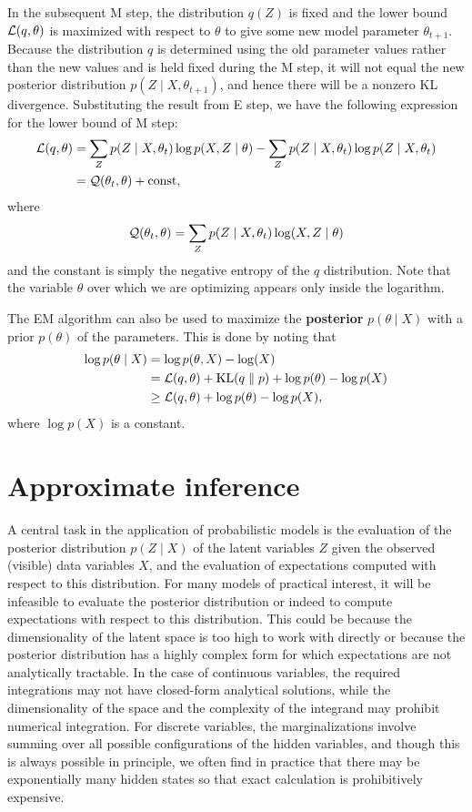 \documentclass[a4paper]{article}
\begin{document}
In the subsequent M step, the distribution $q(Z)$ is fixed
and the lower bound $\mathcal{L}(q, \theta)$ is maximized with
respect to $\theta$ to give some new model parameter
$\theta_{t + 1}$. Because the distribution $q$ is determined
using the old parameter values rather than the new values
and is held fixed during the M step, it will not equal the
new posterior distribution $p(Z \mid X, \theta_{t+1})$,
and hence there will be a nonzero KL divergence.
Substituting the result from E step, we have the following
expression for the lower bound of M step:
\[
\begin{aligned}
  \mathcal{L}(q, \theta)
  &= \sum_Z p(Z \mid X, \theta_t) \log p(X, Z \mid \theta)
  - \sum_Z p(Z \mid X, \theta_t) \log p(Z \mid X, \theta_t) \\
  &= \mathcal{Q}(\theta_t, \theta) + \mathrm{const},
\end{aligned}
\]
where
\[
\mathcal{Q}(\theta_t, \theta) = \sum_Z p(Z \mid X, \theta_t)
\log (X, Z \mid \theta)
\]
and the constant is simply the negative entropy of
the $q$ distribution. Note that the variable $\theta$
over which we are optimizing appears only inside the
logarithm.

The EM algorithm can also be used to maximize the
\textbf{posterior}
$p(\theta \mid X)$ with a prior $p(\theta)$
of the parameters. This is done by noting that
\[
\begin{aligned}
\log p(\theta \mid X)
&= \log p(\theta, X) - \log (X) \\
&= \mathcal{L}(q, \theta) + \mathrm{KL}(q \; \Vert \; p) + \log p(\theta) - \log p(X) \\
&\geq \mathcal{L}(q, \theta) + \log p(\theta) - \log p(X),
\end{aligned}
\]
where $\log p(X)$ is a constant.


\section{Approximate inference}
A central task in the application of probabilistic models is
the evaluation of the posterior distribution $p(Z \mid X)$ of the
latent variables $Z$ given the observed (visible) data variables
$X$, and the evaluation of expectations computed with respect
to this distribution. For many models of practical interest,
it will be infeasible
to evaluate the posterior distribution or indeed to compute
expectations with respect to this distribution.
This could be because the dimensionality of
the latent space is too high to work with directly or
because the posterior distribution has a highly complex
form for which expectations are not analytically tractable.
In the case of continuous variables, the required
integrations may not have closed-form analytical solutions,
while the dimensionality of the space and the complexity of
the integrand may prohibit numerical integration.
For discrete variables, the marginalizations involve
summing over all possible configurations of the hidden
variables, and though this is always possible in principle,
we often find in practice that there may be exponentially
many hidden states so that exact calculation is
prohibitively expensive.
\end{document}
